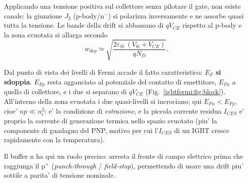 Applicando una tensione positiva sul collettore senza pilotare il gate, non
esiste canale: la giunzione $J_2$ (p-body/$\mathrm{n^{-}}$) si polarizza
inversamente e ne assorbe quasi tutta la tensione. Le bande della drift si
abbassano di $qV_{CE}$ rispetto al p-body e la zona svuotata si allarga
secondo
\begin{equation}
w_{dep} \simeq \sqrt{\frac{2\varepsilon_{Si}\,(V_{bi}+V_{CE})}{q N_D}} .
\end{equation}

Dal punto di vista dei livelli di Fermi accade il fatto caratteristico:
\textbf{$E_F$ si sdoppia}. $E_{Fp}$ resta agganciato al potenziale del contatto
di emettitore, $E_{Fn}$ a quello di collettore, e i due si separano di
$qV_{CE}$ (Fig.~\ref{igbtfermi:fig:block}). All'interno della zona svuotata i due
quasi-livelli si incrociano; qui $E_{Fn}<E_{Fp}$, cioe' $np \ll n_i^2$: e' la
condizione di \emph{estrazione}, e la piccola corrente residua
$I_{CES}$ e' proprio la corrente di generazione termica nello spazio svuotato
(piu' la componente di guadagno del PNP, motivo per cui l'$I_{CES}$ di un IGBT
cresce rapidamente con la temperatura).

Il buffer $\mathrm{n}$ ha qui un ruolo preciso: arresta il fronte di campo
elettrico prima che raggiunga il $\mathrm{p^{+}}$ (\emph{punch-through} /
\emph{field-stop}), permettendo di usare una drift piu' sottile a parita' di
tensione nominale.

